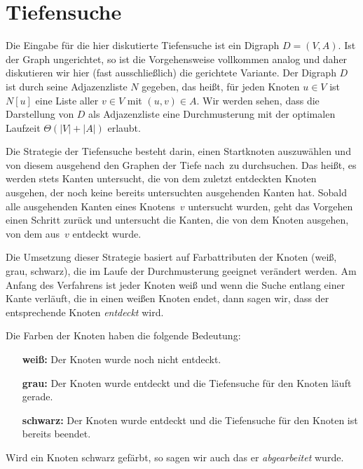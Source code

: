 \section{Tiefensuche}
\label{sect:tiefensuche}


\begin{bem} 
Die Eingabe für die hier diskutierte Tiefensuche ist ein Digraph $D=(V,A)$.
Ist der Graph ungerichtet, so ist die Vorgehensweise vollkommen analog und daher diskutieren wir hier (fast ausschließlich) die gerichtete Variante.
Der Digraph $D$ ist durch seine Adjazenzliste $N$ gegeben, das heißt, für jeden Knoten $u \in V$ ist $N[u]$ eine Liste aller $v \in V$ mit $(u,v) \in A$.
Wir werden sehen, dass die Darstellung von $D$ als Adjazenzliste eine Durchmusterung mit der optimalen Laufzeit $\Theta(|V|+|A|)$ erlaubt.
\end{bem}

\begin{bem} 
Die Strategie der Tiefensuche besteht darin, einen Startknoten auszuwählen und von diesem ausgehend den Graphen \glqq der Tiefe nach\grqq\ zu durchsuchen.
Das heißt, es werden stets Kanten untersucht, die von dem zuletzt entdeckten Knoten ausgehen, der noch keine bereits untersuchten ausgehenden Kanten hat.
Sobald alle ausgehenden Kanten eines Knotens~$v$ untersucht wurden, geht das Vorgehen einen Schritt zurück und untersucht die Kanten, die von dem Knoten ausgehen, von dem aus~$v$ entdeckt wurde.

Die Umsetzung dieser Strategie basiert auf Farbattributen der Knoten (weiß, grau, schwarz), die im Laufe der Durchmusterung geeignet verändert werden.
Am Anfang des Verfahrens ist jeder Knoten weiß und wenn die Suche entlang einer Kante verläuft, die in einen weißen Knoten endet, dann sagen wir, dass der entsprechende Knoten \emph{entdeckt} wird.

Die Farben der Knoten haben die folgende Bedeutung: 
\begin{itemize}
\setlength{\itemindent}{30pt}
	\item[{\bfseries weiß:}] Der Knoten wurde noch nicht entdeckt. 
	\item[{\bfseries grau:}] Der Knoten wurde entdeckt und die Tiefensuche für den Knoten läuft gerade.
	\item[{\bfseries schwarz:}] Der Knoten wurde entdeckt und die Tiefensuche für den Knoten ist bereits beendet.
\end{itemize}

Wird ein Knoten schwarz gefärbt, so sagen wir auch das er \emph{abgearbeitet} wurde.
\end{bem}

